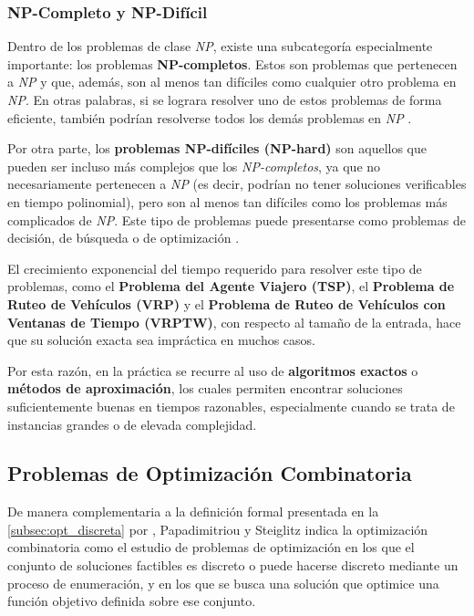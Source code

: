 \documentclass[12pt,titlepage,twoside,openright]{book}
\begin{document}
\subsubsection{NP-Completo y NP-Difícil}

Dentro de los problemas de clase \emph{NP}, existe una subcategoría especialmente importante: los problemas \textbf{NP-completos}. Estos son problemas que pertenecen a \emph{NP} y que, además, son al menos tan difíciles como cualquier otro problema en \emph{NP}. En otras palabras, si se lograra resolver uno de estos problemas de forma eficiente, también podrían resolverse todos los demás problemas en \emph{NP} \citep{maldonado2013problema}.

Por otra parte, los \textbf{problemas NP-difíciles (NP-hard)} son aquellos que pueden ser incluso más complejos que los \emph{NP-completos}, ya que no necesariamente pertenecen a \emph{NP} (es decir, podrían no tener soluciones verificables en tiempo polinomial), pero son al menos tan difíciles como los problemas más complicados de \emph{NP}. Este tipo de problemas puede presentarse como problemas de decisión, de búsqueda o de optimización \citep{maldonado2013problema}.

El crecimiento exponencial del tiempo requerido para resolver este tipo de problemas, como el \textbf{Problema del Agente Viajero (TSP)}, el \textbf{Problema de Ruteo de Vehículos (VRP)} y el \textbf{Problema de Ruteo de Vehículos con Ventanas de Tiempo (VRPTW)}, con respecto al tamaño de la entrada, hace que su solución exacta sea impráctica en muchos casos. 

Por esta razón, en la práctica se recurre al uso de \textbf{algoritmos exactos} o \textbf{métodos de aproximación}, los cuales permiten encontrar soluciones suficientemente buenas en tiempos razonables, especialmente cuando se trata de instancias grandes o de elevada complejidad.

\subsection{Problemas de Optimización Combinatoria}

De manera complementaria a la definición formal presentada en la \autoref{subsec:opt_discreta} por \citep{cobos2010}, Papadimitriou y Steiglitz \citep{papadimitriou1998} indica la optimización combinatoria como el estudio de problemas de optimización en los que el conjunto de soluciones factibles es discreto o puede hacerse discreto mediante un proceso de enumeración, y en los que se busca una solución que optimice una función objetivo definida sobre ese conjunto.
\end{document}
